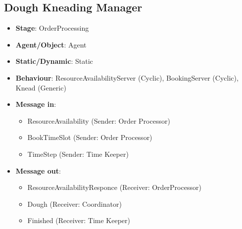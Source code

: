\documentclass[12pt]{article}
\begin{document}
\subsection{Dough Kneading Manager}%
\label{sub:knead_manager}
\begin{itemize}
    \item \textbf{Stage}: OrderProcessing
    \item \textbf{Agent/Object}: Agent
    \item \textbf{Static/Dynamic}: Static
    \item \textbf{Behaviour}: ResourceAvailabilityServer (Cyclic), BookingServer (Cyclic), Knead (Generic)
    \item \textbf{Message in}:
        \begin{itemize}
            \item ResourceAvailability (Sender: Order Processor)
            \item BookTimeSlot (Sender: Order Processor)
            \item TimeStep (Sender: Time Keeper)
        \end{itemize}
    \item \textbf{Message out}:
        \begin{itemize}
            \item ResourceAvailabilityResponce (Receiver: OrderProcessor)
            \item Dough (Receiver: Coordinator)
            \item Finished (Receiver: Time Keeper)
        \end{itemize}
\end{itemize}

\newpage{}
\end{document}
